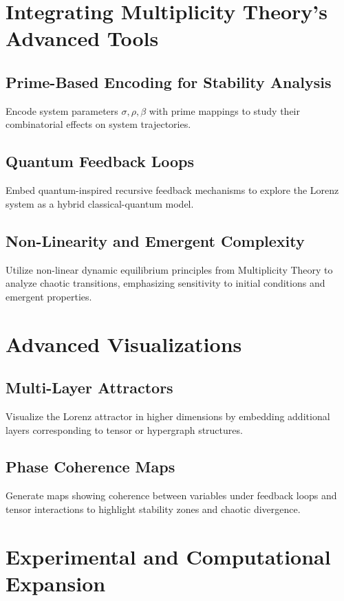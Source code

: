 \documentclass{article}
\theoremstyle{plain}
\begin{document}
\section*{Integrating Multiplicity Theory's Advanced Tools}

\subsection*{Prime-Based Encoding for Stability Analysis}
Encode system parameters \(\sigma, \rho, \beta\) with prime mappings to study their combinatorial effects on system trajectories.

\subsection*{Quantum Feedback Loops}
Embed quantum-inspired recursive feedback mechanisms to explore the Lorenz system as a hybrid classical-quantum model.

\subsection*{Non-Linearity and Emergent Complexity}
Utilize non-linear dynamic equilibrium principles from Multiplicity Theory to analyze chaotic transitions, emphasizing sensitivity to initial conditions and emergent properties.

\section*{Advanced Visualizations}

\subsection*{Multi-Layer Attractors}
Visualize the Lorenz attractor in higher dimensions by embedding additional layers corresponding to tensor or hypergraph structures.

\subsection*{Phase Coherence Maps}
Generate maps showing coherence between variables under feedback loops and tensor interactions to highlight stability zones and chaotic divergence.

\section*{Experimental and Computational Expansion}
\end{document}

